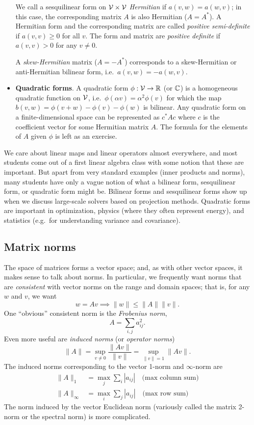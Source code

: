 \documentclass[12pt, leqno]{article} %
\begin{document}
\begin{itemize}
  We call a sesquilinear form on $\mathcal{V} \times \mathcal{V}$ {\em Hermitian} if
  $a(v,w) = a(w,v)$; in this case, the corresponding matrix $A$ is
  also Hermitian ($A = A^*$).  A Hermitian form and the corresponding
  matrix are called {\em positive semi-definite} if $a(v,v) \geq 0$
  for all $v$.  The form and matrix are {\em positive definite} if
  $a(v,v) > 0$ for any $v \neq 0$.

  A {\em skew-Hermitian} matrix
  ($A = -A^*$) corresponds to a skew-Hermitian or anti-Hermitian bilinear
  form, i.e.~$a(v,w) = -a(w,v)$.
\item {\bf Quadratic forms}.  A quadratic form $\phi : \mathcal{V}
  \rightarrow \mathbb{R}$ (or $\mathbb{C}$) is a homogeneous quadratic function
  on $\mathcal{V}$, i.e.~$\phi(\alpha v) = \alpha^2 \phi(v)$ for which the
  map $b(v,w) = \phi(v+w) - \phi(v) - \phi(w)$ is bilinear.
  Any quadratic form on a finite-dimensional space can be
  represented as $c^* A c$ where $c$ is the coefficient vector for
  some Hermitian matrix $A$.  The formula for the elements of $A$
  given $\phi$ is left as an exercise.
\end{itemize}
We care about linear maps and linear operators almost everywhere, and
most students come out of a first linear algebra class with some
notion that these are important.  But apart from very standard
examples (inner products and norms), many students have only a vague
notion of what a bilinear form, sesquilinear form, or quadratic form
might be.  Bilinear forms and sesquilinear forms show up when we
discuss large-scale solvers based on projection methods.  Quadratic
forms are important in optimization, physics (where they often
represent energy), and statistics (e.g.~for understanding variance and
covariance).

\subsection{Matrix norms}

The space of matrices forms a vector space; and, as with other vector
spaces, it makes sense to talk about norms.  In particular, we
frequently want norms that are {\em consistent} with vector norms
on the range and domain spaces; that is, for any $w$ and $v$,
we want
\[
  w = Av \implies \|w\| \leq \|A\| \|v\|.
\]
One ``obvious'' consistent norm is the {\em Frobenius norm},
\[
  A = \sum_{i,j} a_{ij}^2.
\]
Even more useful are {\em induced norms} (or {\em operator norms})
\[
  \|A\| = \sup_{v \neq 0} \frac{\|Av\|}{\|v\|} = \sup_{\|v\|=1} \|Av\|.
\]
The induced norms corresponding to the vector 1-norm and $\infty$-norm
are
\begin{align*}
  \|A\|_1 &= \max_j \sum_i |a_{ij}| \quad \mbox{(max column sum)}\\
  \|A\|_\infty &= \max_i \sum_j |a_{ij}| \quad \mbox{(max row sum)}
\end{align*}
The norm induced by the vector Euclidean norm (variously called
the matrix 2-norm or the spectral norm) is more complicated.
\end{document}
